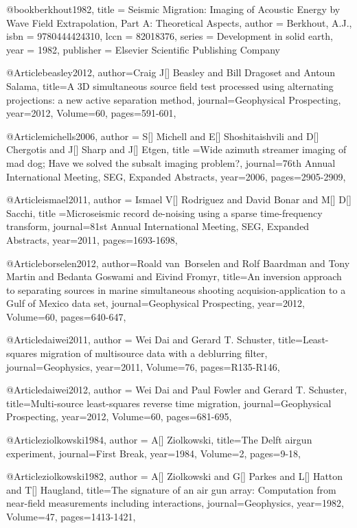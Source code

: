 {@book{berkhout1982,
title     = {Seismic Migration: Imaging of Acoustic Energy by Wave Field Extrapolation, Part A: Theoretical Aspects},
author    = {Berkhout, A.J.},
isbn      = {9780444424310},
lccn      = {82018376},
series    = {Development in solid earth},
year      = {1982},
publisher = {Elsevier Scientific Publishing Company}
}

@Article{beasley2012,
  author={Craig J[] Beasley and Bill Dragoset and Antoun Salama},
  title={A 3{D} simultaneous source field test processed using alternating projections: a new active separation method},
  journal={Geophysical Prospecting},
  year=2012,
  Volume=60,
  pages={591-601},
}

@Article{michells2006,
  author = {S[] Michell and E[] Shoshitaishvili and D[] Chergotis and J[] Sharp and J[] Etgen},
  title ={Wide azimuth streamer imaging of mad dog; Have we solved the subsalt imaging problem?},
  journal={76th Annual International Meeting, SEG, Expanded Abstracts},
  year=2006,
  pages={2905-2909},
}

@Article{ismael2011,
  author = {Ismael V[] Rodriguez and David Bonar and M[] D[] Sacchi},
  title ={Microseismic record de-noising using a sparse time-frequency transform},
  journal={81st Annual International Meeting, SEG, Expanded Abstracts},
  year=2011,
  pages={1693-1698},
}

@Article{borselen2012,
  author={Roald van~Borselen and Rolf Baardman and Tony Martin and Bedanta Goswami and Eivind Fromyr},
  title={An inversion approach to separating sources in marine simultaneous shooting acquision-application to a Gulf of Mexico data set},
  journal={Geophysical Prospecting},
  year=2012,
  Volume=60,
  pages={640-647},
}

@Article{daiwei2011,
  author = {Wei Dai and Gerard T. Schuster},
  title={Least-squares migration of multisource data with a deblurring filter},
  journal={Geophysics},
  year=2011,
  Volume=76,
  pages={R135-R146},
}

@Article{daiwei2012,
  author = {Wei Dai and Paul Fowler and Gerard T. Schuster},
  title={Multi-source least-squares reverse time migration},
  journal={Geophysical Prospecting},
  year=2012,
  Volume=60,
  pages={681-695},
}
	
@Article{ziolkowski1984,
  author = {A[] Ziolkowski},
  title={The Delft airgun experiment},
  journal={First Break},
  year=1984,
  Volume=2,
  pages={9-18},
}

@Article{ziolkowski1982,
  author = {A[] Ziolkowski and G[] Parkes and L[] Hatton and T[] Haugland},
  title={The signature of an air gun array:
Computation from near-field measurements including interactions},
  journal={Geophysics},
  year=1982,
  Volume=47,
  pages={1413-1421},
}

}
